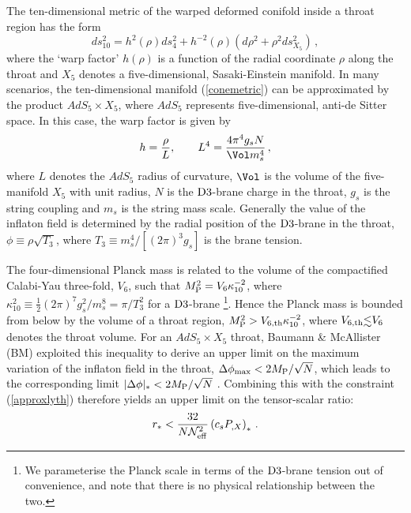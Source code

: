 The ten-dimensional metric of the warped deformed conifold inside a  
throat region has the form 
\begin{equation}
\label{conemetric}
ds_{10}^2= h^2 ( \rho) ds_4^2 + h^{-2} (\rho ) 
\left( d\rho^2 +\rho^2 ds_{X_5}^2 \right) \,,
\end{equation} 
where the `warp factor' $h(\rho )$ is a function of the radial 
coordinate $\rho$ along the throat and $X_5$ denotes a five-dimensional, 
Sasaki-Einstein manifold. In many scenarios, the ten-dimensional 
manifold (\ref{conemetric}) can be approximated by the product 
$AdS_5 \times X_5$, where $AdS_5$ represents five-dimensional, 
anti-de Sitter space. In this case, the warp factor is given by  
\begin{equation}
h = \frac{\rho}{L} , \qquad 
L^4 = \frac{4\pi^4 g_s N}{\Vol m_s^4}\,,
\end{equation} 
where $L$ denotes the $AdS_5$ radius of curvature, 
$\Vol$ is the volume of the five-manifold $X_5$ with unit radius, 
$N$ is the ${\rm D3}$-brane charge in the throat, 
$g_s$ is the string coupling and $m_s$ is the string mass scale. 
Generally the value of the inflaton field 
is determined by the radial position of the 
${\rm D3}$-brane in the throat, 
$\phi \equiv \rho \sqrt{T_3}$, where $T_3 \equiv  
m_s^4/[(2\pi)^3g_s]$ is the brane tension. 

The four-dimensional Planck mass is related to the volume 
of the compactified Calabi-Yau three-fold, $V_6$, such that
$M_{\rm P}^2 =V_6 \kappa_{10}^{-2}$, where $\kappa_{10}^2 \equiv \frac{1}{2}
(2 \pi )^7 g_s^2/ m_s^{8} = \pi /T_3^{2}$ for a 
${\rm D3}$-brane \footnote{We parameterise the Planck scale 
in terms of the ${\rm D3}$-brane tension out of convenience, 
and note that there is no physical relationship between the two.}. 
Hence the Planck mass is bounded from 
below by the volume of a throat region, 
$M_{\rm P}^2 >V_{6,{\rm th}} \kappa_{10}^{-2}$, 
where $V_{6,{\rm th}} \lsim V_6$ denotes the throat volume. 
For an $AdS_5 \times X_5$ throat, Baumann \& McAllister (BM)
exploited this inequality to derive an upper limit on the 
maximum variation of the inflaton field in the throat, 
$\Delta \phi_{\rm max} < 2M_{\rm P}/\sqrt{N}$, which leads to the 
corresponding limit $|\Delta \phi |_* < 2M_{\rm P} /\sqrt{N}$ \cite{bmpaper}.  
Combining this with the constraint (\ref{approxlyth}) therefore 
yields an upper limit on the tensor-scalar ratio: 
\begin{equation}
\label{BMbound}
r_* < \frac{32}{N {\cal{N}}_{\rm eff}^2} \left( 
c_s P_{,X} \right)_* \,.
\end{equation}

